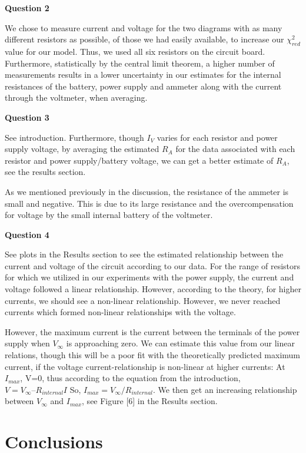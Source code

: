 \documentclass[letterpaper,12pt]{article}
\begin{document}
\textbf{Question 2}

We chose to measure current and voltage for the two diagrams with as 
many different resistors as possible, of those we had easily available, to 
increase our $\chi_{red}^2$ value for our model. Thus, we used all six resistors 
on the circuit board. Furthermore, statistically by the central limit theorem, 
a higher number of measurements results in a lower uncertainty in our estimates 
for the internal resistances of the battery, power supply and ammeter along with 
the current through the voltmeter, when averaging.

\textbf{Question 3}

See introduction. Furthermore, though $I_V$ varies for each resistor and power 
supply voltage, by averaging the estimated $R_A$ for the data associated with 
each resistor and power supply/battery voltage, we can get a better estimate of $R_A$, 
see the results section.

As we mentioned previously in the discussion, the resistance of the ammeter is 
small and negative. This is due to its large resistance and the overcompensation 
for voltage by the small internal battery of the voltmeter.

\textbf{Question 4}

See plots in the Results section to see the estimated relationship between 
the current and voltage of the circuit according to our data. For the range 
of resistors for which we utilized in our experiments with the power supply, 
the current and voltage followed a linear relationship. However, according to 
the theory, for higher currents, we should see a non-linear relationship. 
However, we never reached currents which formed non-linear relationships with the voltage. 

However, the maximum current is the current between the terminals of the power supply when 
$V_{\infty}$ is approaching zero. We can estimate this value from our linear relations, 
though this will be a poor fit with the theoretically predicted maximum current, 
if the voltage current-relationship is non-linear at higher currents:
At $I_{max}$, V=0, thus according to the equation from the introduction, $V = V_{\infty} – R_{internal}I$
So, $I_{max} = V_{\infty}/R_{internal}$.
We then get an increasing relationship between $V_{\infty}$ and $I_{max}$, see Figure [6] in 
the Results section.


\section{Conclusions}
\end{document}

